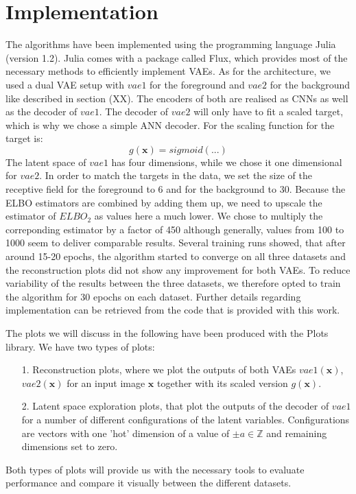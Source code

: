 \documentclass[12pt]{report}
\theoremstyle{definition}
\begin{document}
\section{Implementation}
The algorithms have been implemented using the programming language Julia (version 1.2). Julia comes with a package called Flux, which provides most of the necessary methods to efficiently implement VAEs. 
As for the architecture, we used a dual VAE setup with $vae1$ for the foreground and $vae2$ for the background like described in section (XX). The encoders of both are realised as CNNs as well as the decoder of $vae1$. The decoder of $vae2$ will only have to fit a scaled target, which is why we chose a simple ANN decoder. For the scaling function for the target is:
\begin{equation}
g(\mathbf{x}) = sigmoid(...)
\end{equation}
The latent space of $vae1$ has four dimensions, while we chose it one dimensional for $vae2$. In order to match the targets in the data, we set the size of the receptive field for the foreground to 6 and for the background to 30. Because the ELBO estimators are combined by adding them up, we need to upscale the estimator of $ELBO_2$ as values here a much lower. We chose to multiply the correponding estimator by a factor of 450 although generally, values from 100 to 1000 seem to deliver comparable results.
Several training runs showed, that after around 15-20 epochs, the algorithm started to converge on all three datasets and the reconstruction plots did not show any improvement for both VAEs. To reduce variability of the results between the three datasets, we therefore opted to train the algorithm for 30 epochs on each dataset.
Further details regarding implementation can be retrieved from the code that is provided with this work.

The plots we will discuss in the following have been produced with the Plots library. We have two types of plots:
\begin{itemize}
\item[1.] Reconstruction plots, where we plot the outputs of both VAEs $vae1(\mathbf{x})$, $vae2(\mathbf{x})$ for an input image $\mathbf{x}$ together with its scaled version $g(\mathbf{x})$.
\item[2.] Latent space exploration plots, that plot the outputs of the decoder of $vae1$ for a number of different configurations of the latent variables. Configurations are vectors with one 'hot' dimension of a value of $\pm a \in \mathbb{Z}$ and remaining dimensions set to zero.
\end{itemize}
Both types of plots will provide us with the necessary tools to evaluate performance and compare it visually between the different datasets.
\end{document}
